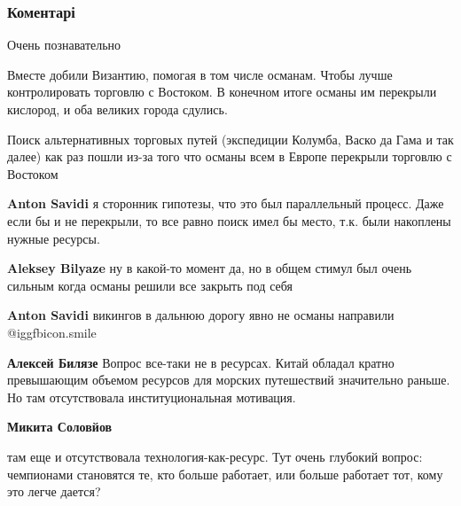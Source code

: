  
 
 
 
 
\subsubsection{Коментарі}

\begin{itemize} %
Очень познавательно


Вместе добили Византию, помогая в том числе османам. Чтобы лучше контролировать
торговлю с Востоком. В конечном итоге османы им перекрыли кислород, и оба
великих города сдулись.

Поиск альтернативных торговых путей (экспедиции Колумба, Васко да Гама и так
далее) как раз пошли из-за того что османы всем в Европе перекрыли торговлю с
Востоком

\begin{itemize} %
\textbf{Anton Savidi} я сторонник гипотезы, что это был параллельный процесс. Даже если бы и не перекрыли, то все равно поиск имел бы место, т.к. были накоплены нужные ресурсы.

\textbf{Aleksey Bilyaze} ну в какой-то момент да, но в общем стимул был очень сильным когда османы решили все закрыть под себя

\textbf{Anton Savidi} викингов в дальнюю дорогу явно не османы направили  @igg{fbicon.smile} 


\textbf{Алексей Билязе} Вопрос все-таки не в ресурсах. Китай обладал кратно превышающим объемом ресурсов для морских путешествий значительно раньше. Но там отсутствовала институциональная мотивация.

\textbf{Микита Соловйов} 

там еще и отсутствовала технология-как-ресурс. Тут очень глубокий вопрос:
чемпионами становятся те, кто больше работает, или больше работает тот, кому
это легче дается?



\end{itemize}
\end{itemize}
